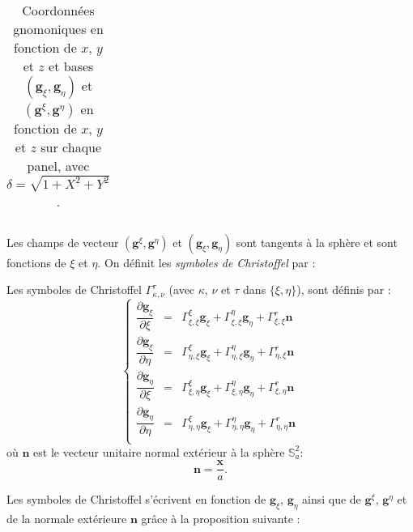 \begin{table}[htbp]
\begin{center}
\begin{tabular}{|c|c|c|}
\end{tabular}
\end{center}
\caption{Coordonnées gnomoniques en fonction de $x$, $y$ et $z$ et bases $\left( \mathbf{g}_{\xi}, \mathbf{g}_{\eta} \right)$ et $\left( \mathbf{g}^{\xi}, \mathbf{g}^{\eta} \right)$ en fonction de $x$, $y$ et $z$  sur chaque panel, avec $\delta=\sqrt{1+X^2+Y^2}$.}
\label{tab: base g_xi g_eta}
\end{table}

Les champs de vecteur $( \mathbf{g}^{\xi}, \mathbf{g}^{\eta})$ et $( \mathbf{g}_ {\xi}, \mathbf{g}_{\eta})$ sont tangents à la sphère et sont fonctions de $\xi$ et $\eta$. On définit les \textit{symboles de Christoffel} par :

\begin{definition}
Les symboles de Christoffel $\Gamma_{\kappa,\nu}^{\tau}$ (avec $\kappa$, $\nu$ et $\tau$ dans $\lbrace \xi, \eta \rbrace$), sont définis par :
\begin{equation}
\left\lbrace
\begin{array}{rcl}
\dfrac{\partial \mathbf{g}_{\xi}}{\partial \xi} & = & \Gamma_{\xi,\xi}^{\xi} \mathbf{g}_{\xi} + \Gamma_{\xi,\xi}^{\eta} \mathbf{g}_{\eta}+ \Gamma_{\xi, \xi}^{r} \mathbf{n}\\

\dfrac{\partial \mathbf{g}_{\xi}}{\partial \eta} & = & \Gamma_{\eta,\xi}^{\xi} \mathbf{g}_{\xi} + \Gamma_{\eta,\xi}^{\eta} \mathbf{g}_{\eta}+ \Gamma_{\eta, \xi}^{r} \mathbf{n}\\

\dfrac{\partial \mathbf{g}_{\eta}}{\partial \xi} & = & \Gamma_{\xi,\eta}^{\xi} \mathbf{g}_{\xi} + \Gamma_{\xi,\eta}^{\eta} \mathbf{g}_{\eta}+ \Gamma_{\xi, \eta}^{r} \mathbf{n}\\

\dfrac{\partial \mathbf{g}_{\eta}}{\partial \eta} & = & \Gamma_{\eta,\eta}^{\xi} \mathbf{g}_{\xi} + \Gamma_{\eta,\eta}^{\eta} \mathbf{g}_{\eta}+ \Gamma_{\eta, \eta}^{r} \mathbf{n}\\
\end{array}
\right.
\end{equation}
où $\mathbf{n}$ est le vecteur unitaire normal extérieur à la sphère $\mathbb{S}_a^2$:
\begin{equation}
\mathbf{n}= \dfrac{\mathbf{x}}{a}.
\end{equation}
\label{def:christoffel}
\end{definition}

Les symboles de Christoffel s'écrivent en fonction de $\mathbf{g}_{\xi}$, $\mathbf{g}_{\eta}$ ainsi que de $\mathbf{g}^{\xi}$, $\mathbf{g}^{\eta}$ et de la normale extérieure $\mathbf{n}$ grâce à la proposition suivante :


